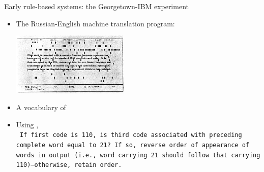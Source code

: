 \documentclass[usenames,dvipsnames,notes,11pt,aspectratio=169]{beamer}
\newcommand{\pdfnote}[1]{}
\begin{document}
\begin{frame}
    {Early rule-based systems: the Georgetown-IBM experiment}
    \begin{itemize}
        \item The Russian-English machine translation program:\\
            \begin{center}
            \includegraphics[height=3cm]{figures/ibm-experiment}
            \end{center}
        \item A vocabulary of 
        \item Using , \eg\\
            \texttt{
                If first code is 110, is third code associated with preceding complete word equal to 21? If so, reverse order of appearance of words in output (i.e., word carrying 21 should follow that carrying 110)---otherwise, retain order.}
    \end{itemize}
    \pdfnote{Aside from the philosophical arguments, there is clear practical motivation for working on NLP. Machine translation (MT) is one such example. In fact, interests in building MT systems started even before AI. The Georgetown-IBM experiment is the first public demonstration of a MT system. It has six grammar rules and a vocabulary of size 250, and was able to translate more than 60 sentences from Russian to English. The demonstration was widely covered and encouraged subsequent funding in MT.}
\end{frame}
\end{document}
